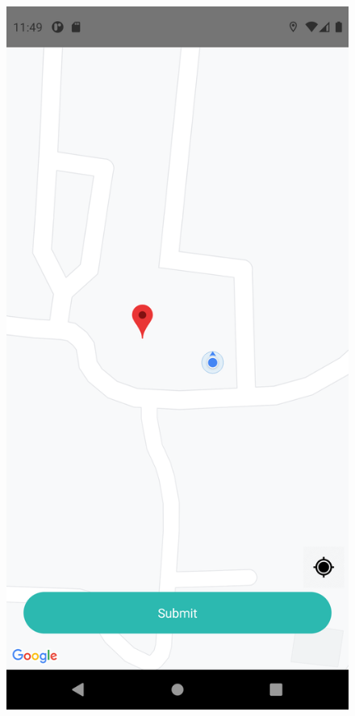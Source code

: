 \documentclass[12pt]{article}
\begin{document}
        \begin{figure}[H]
            \centering
            \begin{minipage}{.5\textwidth}
                \centering
                \includegraphics[scale=0.1]{app_home}

\end{minipage}
\end{figure}
\end{document}
